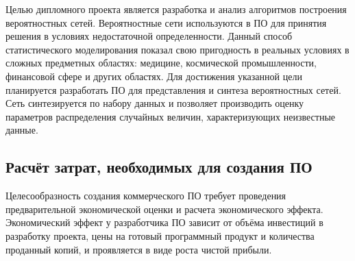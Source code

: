 









\FPround{}


Целью дипломного проекта является разработка и анализ алгоритмов построения вероятностных сетей.
Вероятностные сети используются в ПО для принятия решения в условиях недостаточной определенности.
Данный способ статистического моделирования показал свою пригодность в реальных условиях в сложных предметных областях: медицине, космической промышленности, финансовой сфере и других областях.
Для достижения указанной цели планируется разработать ПО для представления и синтеза вероятностных сетей. 
Сеть синтезируется по набору данных и позволяет производить оценку параметров распределения случайных величин, характеризующих неизвестные данные. 

\subsection{Расчёт затрат, необходимых для создания ПО}

Целесообразность создания коммерческого ПО требует проведения предварительной экономической оценки и расчета экономического эффекта.
Экономический эффект у разработчика ПО зависит от объёма инвестиций в разработку проекта, цены на готовый программный продукт и количества проданный копий, и проявляется в виде роста чистой прибыли.   

